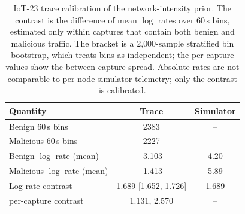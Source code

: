 \begin{table}[t]
\centering
\small
\caption{IoT-23 trace calibration of the network-intensity prior. The contrast is
the difference of mean $\log$ rates over 60\,s bins, estimated only within
captures that contain both benign and malicious traffic. The bracket is a
2{,}000-sample stratified bin bootstrap, which treats bins as independent; the
per-capture values show the between-capture spread. Absolute rates are not
comparable to per-node simulator telemetry; only the contrast is calibrated.}
\label{tab:trace}
\begin{tabular}{lcc}
\toprule
Quantity & Trace & Simulator \\
\midrule
Benign 60\,s bins & 2383 & -- \\
Malicious 60\,s bins & 2227 & -- \\
Benign $\log$ rate (mean) & -3.103 & 4.20 \\
Malicious $\log$ rate (mean) & -1.413 & 5.89 \\
Log-rate contrast & 1.689 [1.652, 1.726] & 1.689 \\
\quad per-capture contrast & 1.131, 2.570 & -- \\
\bottomrule
\end{tabular}
\end{table}
